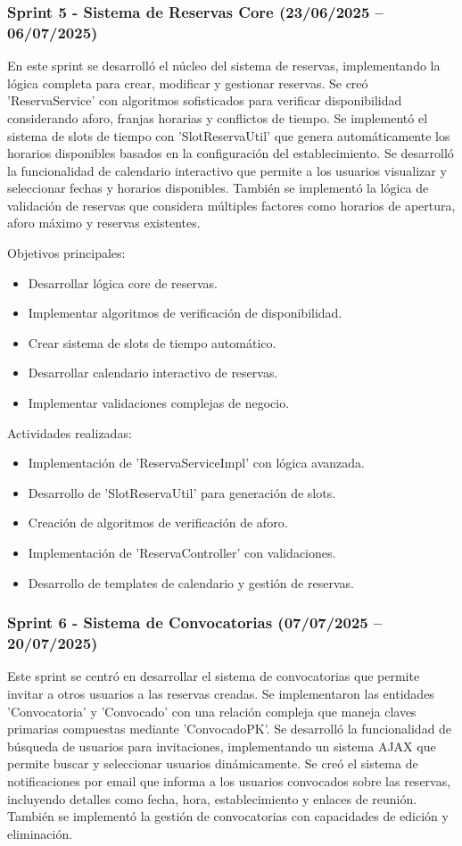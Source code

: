 \subsubsection{Sprint 5 - Sistema de Reservas Core (23/06/2025 – 06/07/2025)} 
En este sprint se desarrolló el núcleo del sistema de reservas, implementando la lógica completa para crear, modificar y gestionar reservas. Se creó 'ReservaService' con algoritmos sofisticados para verificar disponibilidad considerando aforo, franjas horarias y conflictos de tiempo. Se implementó el sistema de slots de tiempo con 'SlotReservaUtil' que genera automáticamente los horarios disponibles basados en la configuración del establecimiento. Se desarrolló la funcionalidad de calendario interactivo que permite a los usuarios visualizar y seleccionar fechas y horarios disponibles. También se implementó la lógica de validación de reservas que considera múltiples factores como horarios de apertura, aforo máximo y reservas existentes.

Objetivos principales:
\begin{itemize}
\tightlist
\item
Desarrollar lógica core de reservas.
\item
Implementar algoritmos de verificación de disponibilidad.
\item
Crear sistema de slots de tiempo automático.
\item
Desarrollar calendario interactivo de reservas.
\item
Implementar validaciones complejas de negocio.
\end{itemize}

Actividades realizadas:
\begin{itemize}
\tightlist
\item
Implementación de 'ReservaServiceImpl' con lógica avanzada.
\item
Desarrollo de 'SlotReservaUtil' para generación de slots.
\item
Creación de algoritmos de verificación de aforo.
\item
Implementación de 'ReservaController' con validaciones.
\item
Desarrollo de templates de calendario y gestión de reservas.
\end{itemize}

\subsubsection{Sprint 6 - Sistema de Convocatorias (07/07/2025 – 20/07/2025)} 
Este sprint se centró en desarrollar el sistema de convocatorias que permite invitar a otros usuarios a las reservas creadas. Se implementaron las entidades 'Convocatoria' y 'Convocado' con una relación compleja que maneja claves primarias compuestas mediante 'ConvocadoPK'. Se desarrolló la funcionalidad de búsqueda de usuarios para invitaciones, implementando un sistema AJAX que permite buscar y seleccionar usuarios dinámicamente. Se creó el sistema de notificaciones por email que informa a los usuarios convocados sobre las reservas, incluyendo detalles como fecha, hora, establecimiento y enlaces de reunión. También se implementó la gestión de convocatorias con capacidades de edición y eliminación.

